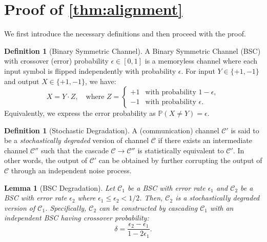 \documentclass{article}
\theoremstyle{plain}
\newtheorem{lemma}[theorem]{Lemma}
\theoremstyle{definition}
\newtheorem{definition}[theorem]{Definition}
\theoremstyle{remark}
\begin{document}
\newpage




\section{Proof of \cref{thm:alignment}}\label{Proof_of_theorem_4_1}

We first introduce the necessary definitions and then proceed with the proof.

\begin{definition}[Binary Symmetric Channel]
\label{def:bsc}
A Binary Symmetric Channel (BSC) with crossover (error) probability $\epsilon \in [0,1]$ is a memoryless channel where each input symbol is flipped independently with probability $\epsilon$. For input $Y \in \{+1, -1\}$ and output $X \in \{+1, -1\}$, we have:
\begin{equation}
    X = Y \cdot Z, \quad \text{where } Z = 
    \begin{cases}
        +1 & \text{with probability } 1 - \epsilon, \\
        -1 & \text{with probability } \epsilon.
    \end{cases}
\end{equation}
Equivalently, we express the error probability as $\mathbb{P}(X \neq Y) = \epsilon$.
\end{definition}

\begin{definition}[Stochastic Degradation]
\label{def:degradation}
A (communication) channel $\mathcal{C}'$ is said to be a \emph{stochastically degraded} version of channel $\mathcal{C}$ if there exists an intermediate channel $\mathcal{C}''$ such that the cascade $\mathcal{C} \to \mathcal{C}''$ is statistically equivalent to $\mathcal{C}'$. In other words, the output of $\mathcal{C}'$ can be obtained by further corrupting the output of $\mathcal{C}$ through an independent noise process.
\end{definition}

\begin{lemma}[BSC Degradation]
\label{lem:bsc_degradation}
Let $\mathcal{C}_1$ be a BSC with error rate $\epsilon_1$ and $\mathcal{C}_2$ be a BSC with error rate $\epsilon_2$ where $\epsilon_1 \le \epsilon_2 < 1/2$. Then, $\mathcal{C}_2$ is a stochastically degraded version of $\mathcal{C}_1$. Specifically, $\mathcal{C}_2$ can be constructed by cascading $\mathcal{C}_1$ with an independent BSC having crossover probability:
\begin{equation}
\label{eq:delta}
    \delta = \frac{\epsilon_2 - \epsilon_1}{1 - 2\epsilon_1}.
\end{equation}
\end{lemma}
\end{document}
